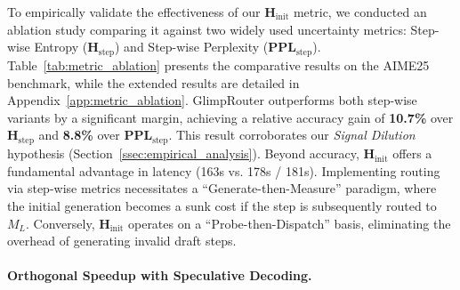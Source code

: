 \documentclass[11pt]{article}
\newcommand{\todoc}[2]{{\textcolor{#1}{{[#2]}}}}
\newcommand{\todoblue}[1]{\todoc{blue}{\textbf{#1}}}
\newcommand{\gu}[1]{\todoblue{Gu: #1}}
\newcommand{\zeng}[1]{\textcolor[rgb]{1,0.66,0}{\textbf{[Zeng: #1]}}}
\newcommand{\approach}{{GlimpRouter}\xspace}
\begin{document}
To empirically validate the effectiveness of our $\mathbf{H}_\text{init}$ metric, we conducted an ablation study comparing it against two widely used uncertainty metrics: Step-wise Entropy ($\mathbf{H}_\text{step}$) and Step-wise Perplexity ($\mathbf{PPL}_\text{step}$).
Table~\ref{tab:metric_ablation} presents the comparative results on the AIME25 benchmark, while the extended results are detailed in Appendix~\ref{app:metric_ablation}.
\approach outperforms both step-wise variants by a significant margin, achieving a relative accuracy gain of \textbf{10.7\%} over $\mathbf{H}_\text{step}$ and \textbf{8.8\%} over $\mathbf{PPL}_\text{step}$.
This result corroborates our \textit{Signal Dilution} hypothesis (Section~\ref{ssec:empirical_analysis}). %
Beyond accuracy, $\mathbf{H}_\text{init}$ offers a fundamental advantage in latency (163s vs. 178s / 181s).
Implementing routing via step-wise metrics necessitates a ``Generate-then-Measure'' paradigm, where the initial generation becomes a sunk cost if the step is subsequently routed to $M_L$.
Conversely, $\mathbf{H}_\text{init}$ operates on a ``Probe-then-Dispatch'' basis, eliminating the overhead of generating invalid draft steps.






\paragraph{Orthogonal Speedup with Speculative Decoding.}
\label{ssec:specdecode}
\end{document}
